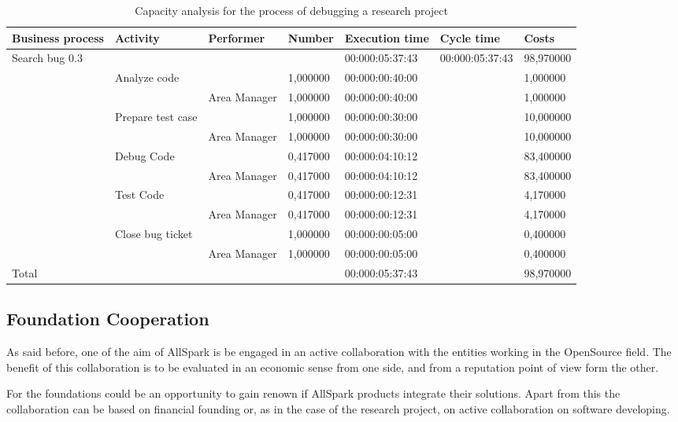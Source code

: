 \begin{landscape}
\centering
\begin{table}
{\tiny
\begin{tabular}{|l|l|l|l|l|l|l|}
Business process&Activity&Performer&Number&Execution time&Cycle
time&Costs\\
\hline
Search bug 0.3&&&&00:000:05:37:43&00:000:05:37:43&98,970000\\
\hline
&Analyze code &&1,000000&00:000:00:40:00&&1,000000\\
\hline
&&Area Manager &1,000000&00:000:00:40:00&&1,000000\\
\hline
&Prepare test case &&1,000000&00:000:00:30:00&&10,000000\\
\hline
&&Area Manager &1,000000&00:000:00:30:00&&10,000000\\
\hline
&Debug Code &&0,417000&00:000:04:10:12&&83,400000\\
\hline
&&Area Manager &0,417000&00:000:04:10:12&&83,400000\\
\hline
&Test Code &&0,417000&00:000:00:12:31&&4,170000\\
\hline
&&Area Manager &0,417000&00:000:00:12:31&&4,170000\\
\hline
&Close bug ticket &&1,000000&00:000:00:05:00&&0,400000\\
\hline
&&Area Manager &1,000000&00:000:00:05:00&&0,400000\\
\hline
Total&&&&00:000:05:37:43&&98,970000\\
\hline
\end{tabular}
}
\caption{Capacity analysis for the process of debugging a research project} 
\label{2tab:debug}
\end{table}
\end{landscape}



\subsection{Foundation Cooperation}
As said before, one of the aim of AllSpark is be engaged in an active
collaboration with the entities working in the OpenSource field. The
benefit of this collaboration is to be evaluated in an economic sense from
one side, and from a reputation point of view form the other.

For the foundations could be an opportunity to gain renown if AllSpark
products integrate their solutions. Apart from this the collaboration can
be based on financial founding or, as in the case of the research project,
on active collaboration on software developing.

